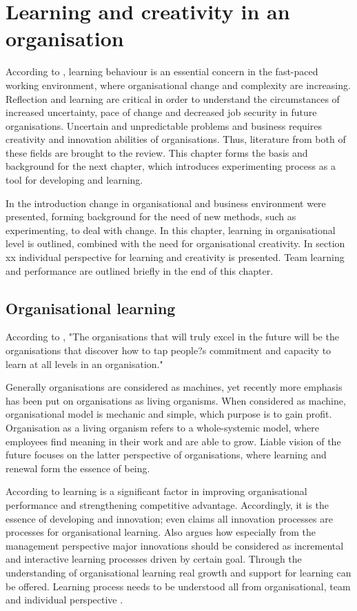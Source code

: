 \chapter{Learning and creativity in an organisation}
According to \citet{edmondson1999psychological}, learning behaviour is an essential concern in the fast-paced working environment, where organisational change and complexity are increasing. Reflection and learning are critical in order to understand the circumstances of increased uncertainty, pace of change and decreased job security in future organisations. Uncertain and unpredictable problems and business requires creativity and innovation abilities of organisations. Thus, literature from both of these fields are brought to the review. This chapter forms the basis and background for the next chapter, which introduces experimenting process as a tool for developing and learning. 

In the introduction change in organisational and business environment were presented, forming background for the need of new methods, such as experimenting, to deal with change. In this chapter, learning in organisational level is outlined, combined with the need for organisational creativity. In section xx individual perspective for learning and creativity is presented. Team learning and performance are outlined briefly in the end of this chapter. 

\section{Organisational learning}
According to \citet{senge1990fifth}, "The organisations that will truly excel in the future will be the organisations that discover how to tap people?s commitment and capacity to learn at all levels in an organisation."

Generally organisations are considered as machines, yet recently more emphasis has been put on organisations as living organisms. When considered as machine, organisational model is mechanic and simple, which purpose is to gain profit. Organisation as a living organism refers to a whole-systemic model, where employees find meaning in their work and are able to grow. Liable vision of the future focuses on the latter perspective of organisations, where learning and renewal form the essence of being. \citep{geus1997living}

According to \citet{march1991exploration} learning is a significant factor in improving organisational performance and strengthening competitive advantage. Accordingly, it is the essence of developing and innovation; \citet{buijs2007innovation} even claims all innovation processes are processes for organisational learning. Also \citep{quinn1985managing} argues how especially from the management perspective major innovations should be considered as incremental and interactive learning processes driven by certain goal. Through the understanding of organisational learning real growth and support for learning can be offered. Learning process needs to be understood all from organisational, team and individual perspective \citep{buijs2007innovation}. 

